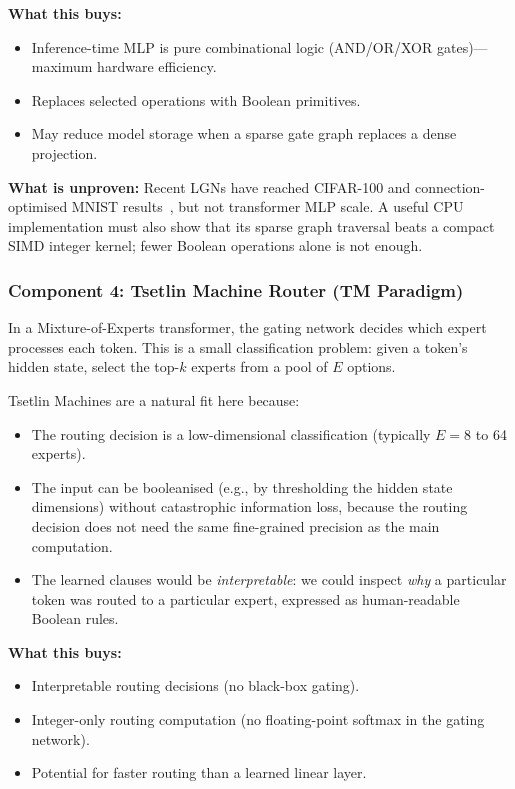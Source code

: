 \textbf{What this buys:}
\begin{itemize}[leftmargin=2em]
  \item Inference-time MLP is pure combinational logic (AND/OR/XOR
    gates)---maximum hardware efficiency.
  \item Replaces selected operations with Boolean primitives.
  \item May reduce model storage when a sparse gate graph replaces a
    dense projection.
\end{itemize}

\textbf{What is unproven:} Recent LGNs have reached CIFAR-100 and
connection-optimised MNIST results~\cite{ruttgers2025light,mommen2026fullytrainable},
but not transformer MLP scale. A useful CPU implementation must also show
that its sparse graph traversal beats a compact SIMD integer kernel; fewer
Boolean operations alone is not enough.

\subsubsection{Component 4: Tsetlin Machine Router (TM Paradigm)}

In a Mixture-of-Experts transformer, the gating network decides which
expert processes each token. This is a small classification problem:
given a token's hidden state, select the top-$k$ experts from a pool
of $E$ options.

Tsetlin Machines are a natural fit here because:
\begin{itemize}[leftmargin=2em]
  \item The routing decision is a low-dimensional classification
    (typically $E = 8$ to 64 experts).
  \item The input can be booleanised (e.g., by thresholding the
    hidden state dimensions) without catastrophic information loss,
    because the routing decision does not need the same fine-grained
    precision as the main computation.
  \item The learned clauses would be \emph{interpretable}: we could
    inspect \emph{why} a particular token was routed to a particular
    expert, expressed as human-readable Boolean rules.
\end{itemize}

\textbf{What this buys:}
\begin{itemize}[leftmargin=2em]
  \item Interpretable routing decisions (no black-box gating).
  \item Integer-only routing computation (no floating-point softmax
    in the gating network).
  \item Potential for faster routing than a learned linear layer.
\end{itemize}

